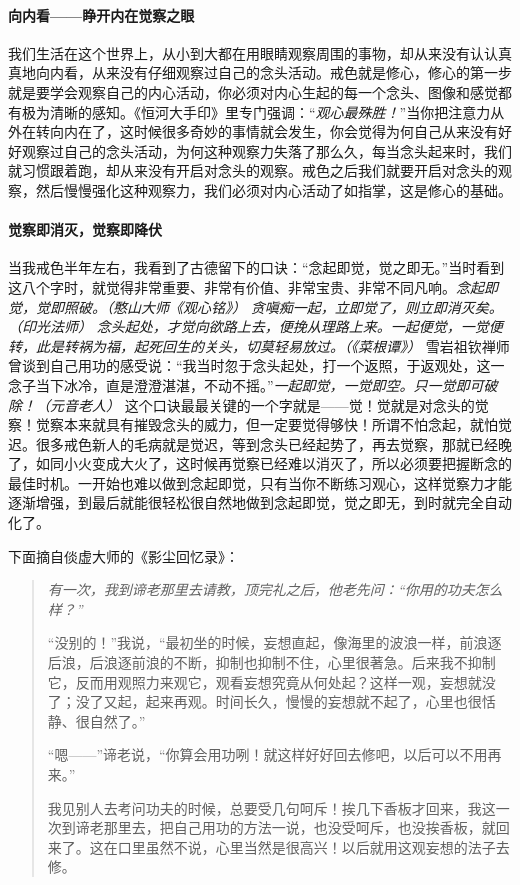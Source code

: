 \paragraph{向内看——睁开内在觉察之眼}

我们生活在这个世界上，从小到大都在用眼睛观察周围的事物，却从来没有认认真真地向内看，从来没有仔细观察过自己的念头活动。戒色就是修心，修心的第一步就是要学会观察自己的内心活动，你必须对内心生起的每一个念头、图像和感觉都有极为清晰的感知。《恒河大手印》里专门强调：“\textit{观心最殊胜！}”当你把注意力从外在转向内在了，这时候很多奇妙的事情就会发生，你会觉得为何自己从来没有好好观察过自己的念头活动，为何这种观察力失落了那么久，每当念头起来时，我们就习惯跟着跑，却从来没有开启对念头的观察。戒色之后我们就要开启对念头的观察，然后慢慢强化这种观察力，我们必须对内心活动了如指掌，这是修心的基础。

\paragraph{觉察即消灭，觉察即降伏}

当我戒色半年左右，我看到了古德留下的口诀：“念起即觉，觉之即无。”当时看到这八个字时，就觉得非常重要、非常有价值、非常宝贵、非常不同凡响。\textit{念起即觉，觉即照破。（憨山大师《观心铭》）} \textit{贪嗔痴一起，立即觉了，则立即消灭矣。（印光法师）} \textit{念头起处，才觉向欲路上去，便挽从理路上来。一起便觉，一觉便转，此是转祸为福，起死回生的关头，切莫轻易放过。（《菜根谭》）} 雪岩祖钦禅师曾谈到自己用功的感受说：“我当时忽于念头起处，打一个返照，于返观处，这一念子当下冰冷，直是澄澄湛湛，不动不摇。”\textit{一起即觉，一觉即空。只一觉即可破除！（元音老人）} 这个口诀最最关键的一个字就是——觉！觉就是对念头的觉察！觉察本来就具有摧毁念头的威力，但一定要觉得够快！所谓不怕念起，就怕觉迟。很多戒色新人的毛病就是觉迟，等到念头已经起势了，再去觉察，那就已经晚了，如同小火变成大火了，这时候再觉察已经难以消灭了，所以必须要把握断念的最佳时机。一开始也难以做到念起即觉，只有当你不断练习观心，这样觉察力才能逐渐增强，到最后就能很轻松很自然地做到念起即觉，觉之即无，到时就完全自动化了。

下面摘自倓虚大师的《影尘回忆录》：

\begin{quotation}\it
    有一次，我到谛老那里去请教，顶完礼之后，他老先问：“你用的功夫怎么样？”

    “没别的！”我说，“最初坐的时候，妄想直起，像海里的波浪一样，前浪逐后浪，后浪逐前浪的不断，抑制也抑制不住，心里很著急。后来我不抑制它，反而用观照力来观它，观看妄想究竟从何处起？这样一观，妄想就没了；没了又起，起来再观。时间长久，慢慢的妄想就不起了，心里也很恬静、很自然了。”

    “嗯——”谛老说，“你算会用功咧！就这样好好回去修吧，以后可以不用再来。”

    我见别人去考问功夫的时候，总要受几句呵斥！挨几下香板才回来，我这一次到谛老那里去，把自己用功的方法一说，也没受呵斥，也没挨香板，就回来了。这在口里虽然不说，心里当然是很高兴！以后就用这观妄想的法子去修。
\end{quotation}

